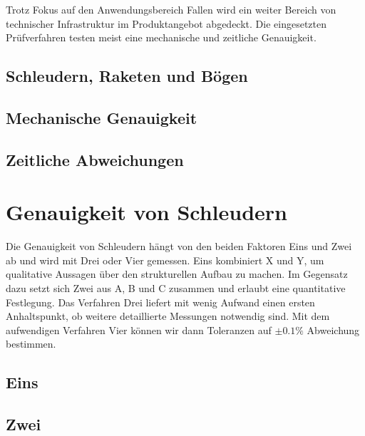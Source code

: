 \documentclass[11pt,a4paper]{report}
\begin{document}
    Trotz Fokus auf den Anwendungsbereich Fallen wird ein weiter Bereich
    von technischer Infrastruktur im Produktangebot abgedeckt.
    Die eingesetzten Prüfverfahren testen meist eine mechanische
    und zeitliche Genauigkeit.

    \section{Schleudern, Raketen und Bögen} \label{sec:was}

    \blindtext[1]

    \section{Mechanische Genauigkeit} \label{sec:mec}

    \blindtext[1]

    \section{Zeitliche Abweichungen} \label{sec:time}

    \blindtext[1]

    \chapter{Genauigkeit von Schleudern} \label{ch:sling}

    Die Genauigkeit von Schleudern hängt von den beiden Faktoren
    Eins und Zwei ab und wird mit Drei oder Vier gemessen.
    Eins kombiniert X und Y, um qualitative Aussagen über den
    strukturellen Aufbau zu machen.
    Im Gegensatz dazu setzt sich Zwei aus A, B und C zusammen
    und erlaubt eine quantitative Festlegung.
    Das Verfahren Drei liefert mit wenig Aufwand einen ersten
    Anhaltspunkt, ob weitere detaillierte Messungen notwendig sind.
    Mit dem aufwendigen Verfahren Vier können wir dann Toleranzen
    auf $\pm 0.1\%$ Abweichung bestimmen.

    \section{Eins}

    \blindtext[1]

    \section{Zwei}

    \blindtext[1]
\end{document}
